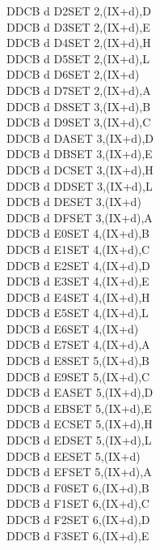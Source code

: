 \begin{multicols}{3}
{\begin{tabbing}
    DDCB d D2\>SET 2,(IX+d),D\UNDOC\\
    DDCB d D3\>SET 2,(IX+d),E\UNDOC\\
    DDCB d D4\>SET 2,(IX+d),H\UNDOC\\
    DDCB d D5\>SET 2,(IX+d),L\UNDOC\\
    DDCB d D6\>SET 2,(IX+d)\\
    DDCB d D7\>SET 2,(IX+d),A\UNDOC\\
    DDCB d D8\>SET 3,(IX+d),B\UNDOC\\
    DDCB d D9\>SET 3,(IX+d),C\UNDOC\\
    DDCB d DA\>SET 3,(IX+d),D\UNDOC\\
    DDCB d DB\>SET 3,(IX+d),E\UNDOC\\
    DDCB d DC\>SET 3,(IX+d),H\UNDOC\\
    DDCB d DD\>SET 3,(IX+d),L\UNDOC\\
    DDCB d DE\>SET 3,(IX+d)\\
    DDCB d DF\>SET 3,(IX+d),A\UNDOC\\
    DDCB d E0\>SET 4,(IX+d),B\UNDOC\\
    DDCB d E1\>SET 4,(IX+d),C\UNDOC\\
    DDCB d E2\>SET 4,(IX+d),D\UNDOC\\
    DDCB d E3\>SET 4,(IX+d),E\UNDOC\\
    DDCB d E4\>SET 4,(IX+d),H\UNDOC\\
    DDCB d E5\>SET 4,(IX+d),L\UNDOC\\
    DDCB d E6\>SET 4,(IX+d)\\
    DDCB d E7\>SET 4,(IX+d),A\UNDOC\\
    DDCB d E8\>SET 5,(IX+d),B\UNDOC\\
    DDCB d E9\>SET 5,(IX+d),C\UNDOC\\
    DDCB d EA\>SET 5,(IX+d),D\UNDOC\\
    DDCB d EB\>SET 5,(IX+d),E\UNDOC\\
    DDCB d EC\>SET 5,(IX+d),H\UNDOC\\
    DDCB d ED\>SET 5,(IX+d),L\UNDOC\\
    DDCB d EE\>SET 5,(IX+d)\\
    DDCB d EF\>SET 5,(IX+d),A\UNDOC\\
    DDCB d F0\>SET 6,(IX+d),B\UNDOC\\
    DDCB d F1\>SET 6,(IX+d),C\UNDOC\\
    DDCB d F2\>SET 6,(IX+d),D\UNDOC\\
    DDCB d F3\>SET 6,(IX+d),E\UNDOC\\

\end{tabbing}}
\end{multicols}
